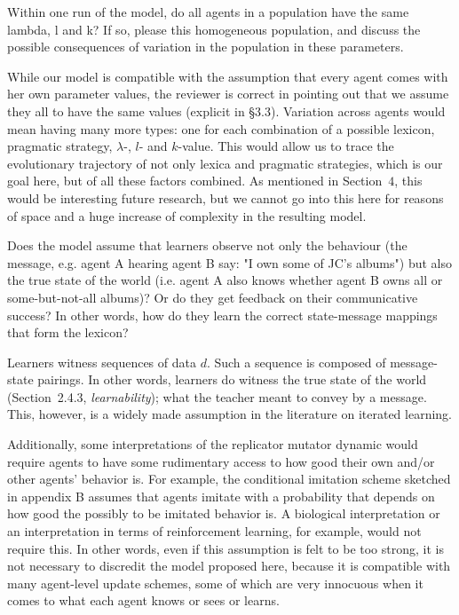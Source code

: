 \documentclass[12pt,a4paper]{article}
\begin{document}
\vspace{.5cm}
  \begin{mdframed}[backgroundcolor=gray!25,linecolor=gray!25]
Within one run of the model, do all agents in a population have the same lambda, l and k? If so, please this homogeneous population, and discuss the possible consequences of variation in the population in these parameters.
\end{mdframed}
While our model is compatible with the assumption that every agent comes with her own parameter
values, the reviewer is correct in pointing out that we assume they all to have the same values
(explicit in \S3.3). Variation across agents would mean having many more types: one for each
combination of a possible lexicon, pragmatic strategy, $\lambda$-, $l$- and $k$-value. This
would allow us to trace the evolutionary trajectory of not only lexica and pragmatic
strategies, which is our goal here, but of all these factors combined. As mentioned in
Section~$4$, this would be interesting future research, but we cannot go into this here for
reasons of space and a huge increase of complexity in the resulting model. 

\vspace{.5cm}
\begin{mdframed}[backgroundcolor=gray!25,linecolor=gray!25]
Does the model assume that learners observe not only the behaviour (the message, e.g. agent A hearing agent B say: "I own some of JC's albums") but also the true state of the world (i.e. agent A also knows whether agent B owns all or some-but-not-all albums)? Or do they get feedback on their communicative success? In other words, how do they learn the correct state-message mappings that form the lexicon? 
\end{mdframed}
Learners witness sequences of data $d$. Such a sequence is composed of message-state
pairings. In other words, learners do witness the true state of the world (Section~2.4.3, {\em
  learnability}); what the teacher meant to convey by a message. This, however, is a widely made assumption in the literature on iterated
learning. 

Additionally, some interpretations of the replicator mutator dynamic would require agents to
have some rudimentary access to how good their own and/or other agents' behavior is. For
example, the conditional imitation scheme sketched in appendix B assumes that agents imitate
with a probability that depends on how good the possibly to be imitated behavior is. A
biological interpretation or an interpretation in terms of reinforcement learning, for example,
would not require this. In other words, even if this assumption is felt to be too strong, it is
not necessary to discredit the model proposed here, because it is compatible with many
agent-level update schemes, some of which are very innocuous when it comes to what each agent
knows or sees or learns.
\end{document}
